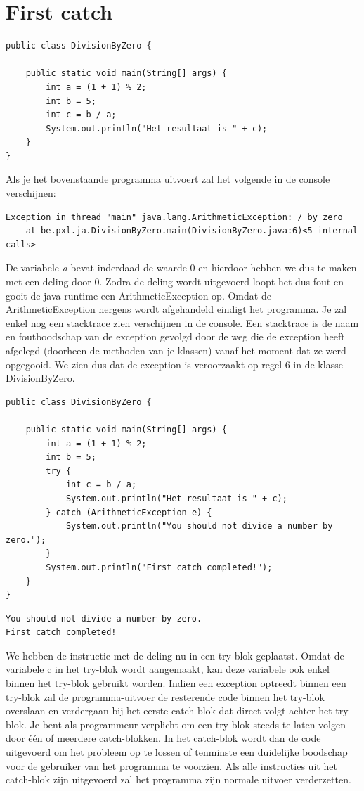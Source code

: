 \section{First catch}

\begin{lstlisting}
public class DivisionByZero {

	public static void main(String[] args) {
		int a = (1 + 1) % 2;
		int b = 5;
		int c = b / a;
		System.out.println("Het resultaat is " + c);
	}
}
\end{lstlisting}

Als je het bovenstaande programma uitvoert zal het volgende in de console verschijnen:

\begin{verbatim}
Exception in thread "main" java.lang.ArithmeticException: / by zero
	at be.pxl.ja.DivisionByZero.main(DivisionByZero.java:6)<5 internal calls>
\end{verbatim}
  
De variabele \textit{a} bevat inderdaad de waarde 0 en hierdoor hebben we dus te maken met een deling door 0. Zodra de deling wordt uitgevoerd loopt het dus fout en gooit de java runtime een ArithmeticException op. Omdat de ArithmeticException nergens wordt afgehandeld eindigt het programma. Je zal enkel nog een stacktrace zien verschijnen in de console. Een stacktrace is de naam en foutboodschap van de exception gevolgd door de weg die de exception heeft afgelegd (doorheen de methoden van je klassen) vanaf het moment dat ze werd opgegooid. We zien dus dat de exception is veroorzaakt op regel 6 in de klasse DivisionByZero.

\begin{lstlisting}
public class DivisionByZero {

	public static void main(String[] args) {
		int a = (1 + 1) % 2;
		int b = 5;
		try {
			int c = b / a;
			System.out.println("Het resultaat is " + c);
		} catch (ArithmeticException e) {
			System.out.println("You should not divide a number by zero.");
		}
		System.out.println("First catch completed!");
	}
}
\end{lstlisting}

\begin{verbatim}
You should not divide a number by zero.
First catch completed!
\end{verbatim}

We hebben de instructie met de deling nu in een try-blok geplaatst. Omdat de variabele c in het try-blok wordt aangemaakt, kan deze variabele ook enkel binnen het try-blok gebruikt worden. Indien een exception optreedt binnen een try-blok zal de programma-uitvoer de resterende code binnen het try-blok overslaan en verdergaan bij het eerste catch-blok dat direct volgt achter het try-blok. Je bent als programmeur verplicht om een try-blok steeds te laten volgen door \'e\'en of meerdere catch-blokken.
In het catch-blok wordt dan de code uitgevoerd om het probleem op te lossen of tenminste een duidelijke boodschap voor de gebruiker van het programma te voorzien.
Als alle instructies uit het catch-blok zijn uitgevoerd zal het programma zijn normale uitvoer verderzetten.


